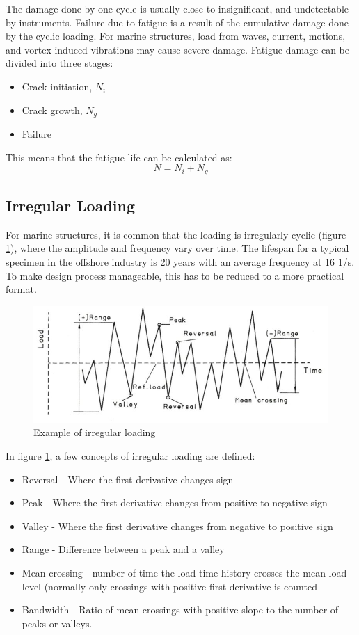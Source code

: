  \noindent The damage done by one cycle is usually close to insignificant, and undetectable by instruments. Failure due to fatigue is a result of the cumulative damage done by the cyclic loading. For marine structures, load from waves, current, motions, and vortex-induced vibrations may cause severe damage. Fatigue damage can be divided into three stages:
 \begin{itemize}
     \item Crack initiation, $N_i$
     \item Crack growth, $N_g$
     \item Failure
 \end{itemize}
 This means that the fatigue life can be calculated as:
 \begin{equation}
     N=N_i+N_g
 \end{equation}
 
\subsection{Irregular Loading}
For marine structures, it is common that the loading is irregularly cyclic (figure \ref{fig:irr}), where the amplitude and frequency vary over time. The lifespan for a typical specimen in the offshore industry is 20 years with an average frequency at 16 1/s. To make design process manageable, this has to be reduced to a more practical format.  

\begin{figure}[H]
\centering
\includegraphics[scale=0.8]{figures/irr}
\caption[$\; \:$Example of irregular loading]{Example of irregular loading  \cite{fatigue2016} }
 \label{fig:irr}
\end{figure}

In figure \ref{fig:irr}, a few concepts of irregular loading are defined:
\begin{itemize}
\item Reversal - Where the first derivative changes sign
    \item Peak - Where the first derivative changes from positive to negative sign
    \item Valley - Where the first derivative changes from negative to positive sign
    \item Range - Difference between a peak and a valley
    \item Mean crossing - number of time the load-time history crosses the mean load level (normally only crossings with positive first derivative is counted
    \item Bandwidth - Ratio of mean crossings with positive slope to the number of peaks or valleys. 
\end{itemize}
 
